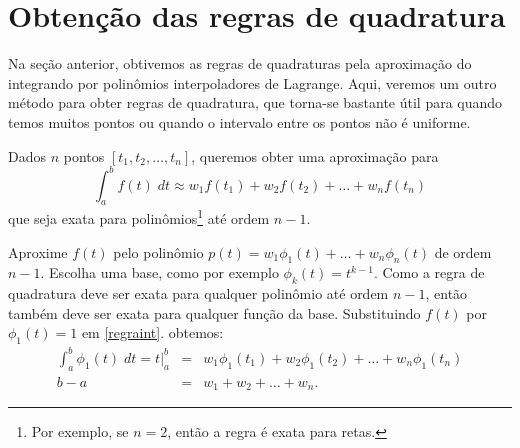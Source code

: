 \section{Obtenção das regras de quadratura}

Na seção anterior, obtivemos as regras de quadraturas pela aproximação do integrando por polinômios interpoladores de Lagrange. Aqui, veremos um outro método para obter regras de quadratura, que torna-se bastante útil para quando temos muitos pontos ou quando o intervalo entre os pontos não é uniforme.

Dados $n$ pontos $[t_1, t_2, \ldots,t_n]$, queremos obter uma aproximação para
\begin{equation}\label{regraint}
  \int _a^b f(t) \;dt \approx w_1f(t_1)+w_2f(t_2)+\ldots +w_nf(t_n)
\end{equation}
que seja exata para polinômios\footnote{Por exemplo, se $n=2$, então a regra é exata para retas.} até ordem  $n-1$.

Aproxime $f(t)$ pelo polinômio $p(t)=w_1\phi_1(t)+\ldots +w_n \phi_n(t)$ de ordem $n-1$. Escolha uma base, como por exemplo $\phi _k(t)=t^{k-1}$. Como a regra de quadratura deve ser exata para qualquer polinômio até ordem $n-1$, então também deve ser exata para qualquer função da base. Substituindo $f(t)$ por $\phi _1(t)=1$ em \eqref{regraint}. obtemos:
\begin{eqnarray}
\int _a^b \phi_1(t) \; dt = t|_a^b &=&  w_1\phi _1(t_1)+w_2\phi _1(t_2)+\ldots +w_n\phi_1(t_n) \\
                              b-a  &=&  w_1+w_2+\ldots +w_n.
\end{eqnarray}

